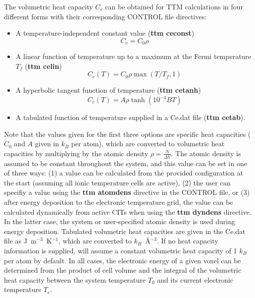 The volumetric heat capacity $C_e$
can be obtained for TTM calculations in four different forms with their
corresponding CONTROL file directives:
\begin{itemize}
\item A temperature-independent constant value ({\bf ttm ceconst})\begin{equation*}C_e = C_0 \rho\end{equation*}
\item A linear function of temperature up to a maximum at the Fermi temperature $T_{f}$ ({\bf ttm celin}) \begin{equation*}C_e (T) = C_0 \rho \max \left(T/T_{f}, 1\right)\end{equation*}
\item A hyperbolic tangent function of temperature ({\bf ttm cetanh}) \begin{equation*}C_e (T) = A \rho \tanh \left(10^{-4} B T\right)\end{equation*}
\item A tabulated function of temperature supplied in a Ce.dat file  ({\bf ttm cetab}).
\end{itemize}
Note that the values given for the first three options are specific heat
capacities ($C_0$ and $A$ given in $k_B$ per atom), which are
converted to volumetric heat capacities by multiplying by the atomic
density $\rho = \frac{N}{\Delta V}$. The atomic density is assumed to
be constant throughout the system, and this value can be set in one of three
ways: (1) a value can be calculated from the provided configuration at the
start (assuming all ionic temperature cells are active), (2) the user can
specifiy a value using the {\bf ttm atomdens} directive in the CONTROL file,
or (3) after energy deposition to the electronic temperature grid, the value
can be calculated dynamically from active CITs when using the {\bf ttm dyndens}
directive. In the latter case, the system or user-specified atomic density is
used during energy deposition. Tabulated volumetric heat capacities are
given in the Ce.dat file as J~m$^{-3}$~K$^{-1}$, which are converted to
$k_B$~\AA$^{-3}$. If no heat capacity information is supplied, \D will
assume a constant volumetric heat capacity of 1 $k_B$ per atom by
default. In all cases, the electronic energy of a given voxel can be
determined from the product of cell volume and the integral of the
volumetric heat capacity between the system temperature $T_0$
and its current electronic temperature $T_e$.

